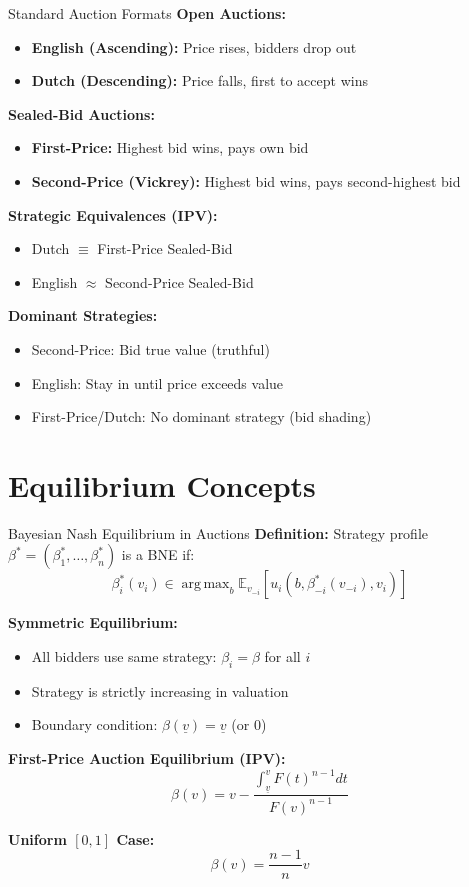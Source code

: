 \documentclass[xcolor={x11names}]{beamer}
\DeclareMathOperator*{\argmax}{arg\,max}
\begin{document}
\begin{frame}{Standard Auction Formats}
\textbf{Open Auctions:}
\begin{itemize}
  \item \textbf{English (Ascending):} Price rises, bidders drop out
  \item \textbf{Dutch (Descending):} Price falls, first to accept wins
\end{itemize}


\textbf{Sealed-Bid Auctions:}
\begin{itemize}
  \item \textbf{First-Price:} Highest bid wins, pays own bid
  \item \textbf{Second-Price (Vickrey):} Highest bid wins, pays second-highest bid
\end{itemize}


\textbf{Strategic Equivalences (IPV):}
\begin{itemize}
  \item Dutch $\equiv$ First-Price Sealed-Bid
  \item English $\approx$ Second-Price Sealed-Bid
\end{itemize}


\textbf{Dominant Strategies:}
\begin{itemize}
  \item Second-Price: Bid true value (truthful)
  \item English: Stay in until price exceeds value
  \item First-Price/Dutch: No dominant strategy (bid shading)
\end{itemize}
\end{frame}

\section{Equilibrium Concepts}

\begin{frame}{Bayesian Nash Equilibrium in Auctions}
\textbf{Definition:} Strategy profile $\beta^* = (\beta_1^*, \ldots, \beta_n^*)$ is a BNE if:
\[\beta_i^*(v_i) \in \argmax_{b} \mathbb{E}_{v_{-i}}[u_i(b, \beta_{-i}^*(v_{-i}), v_i)]\]


\textbf{Symmetric Equilibrium:}
\begin{itemize}
  \item All bidders use same strategy: $\beta_i = \beta$ for all $i$
  \item Strategy is strictly increasing in valuation
  \item Boundary condition: $\beta(\underline{v}) = \underline{v}$ (or 0)
\end{itemize}


\textbf{First-Price Auction Equilibrium (IPV):}
\[\beta(v) = v - \frac{\int_{\underline{v}}^v F(t)^{n-1}dt}{F(v)^{n-1}}\]

\textbf{Uniform $[0,1]$ Case:}
\[\beta(v) = \frac{n-1}{n}v\]
\end{frame}
\end{document}
